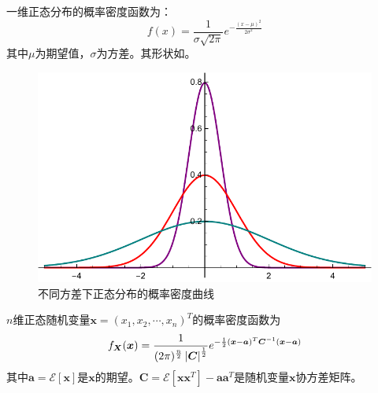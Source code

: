     一维正态分布的概率密度函数为：
    \begin{equation}
        f(x)=\frac{1}{\sigma\sqrt{2\pi}}e^{-\frac{(x-\mu)^2}{2\sigma^2}}
    \end{equation}
    其中$\mu$为期望值，$\sigma$为方差。其形状如。
    \begin{figure}[H]
        \centering
        \includegraphics[scale=0.8]{body/image/NormalDistribution.pdf}
        \caption{不同方差下正态分布的概率密度曲线}
        \label{fig:NormalDistribution}
    \end{figure}

    $n$维正态随机变量$\bm x=(x_1,x_2,\cdots,x_n)^T$的概率密度函数为
    \begin{equation}\label{eq:NoramlDistribution}
        f_{\bm X}(\bm x)=\frac{1}{(2\pi)^{\frac{n}{2}}\left\vert \bm C \right\vert^\frac{1}{2}}e^{-\frac{1}{2}(\bm x - \bm a)^T\bm C^{-1}(\bm x - \bm a)}
    \end{equation}
    其中$\bm a=\mathscr{E}[\bm x]$是$\bm x$的期望。$\bm C=\mathscr{E}[\bm{xx}^T]-\bm{aa}^T$是随机变量$\bm x$协方差矩阵。


